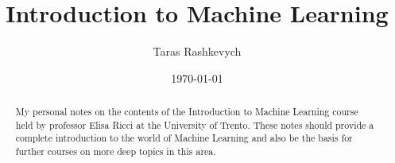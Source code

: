 \documentclass[12pt, letterpaper, twoside]{article}
\title{Introduction to Machine Learning}
\author{Taras Rashkevych}
\date{\today}
\begin{document}
\begin{titlepage}
    \maketitle
\end{titlepage}

\begin{abstract}
    My personal notes on the contents of the
    Introduction to Machine Learning course held
    by professor Elisa Ricci at the University of Trento.
    These notes should provide a complete introduction
    to the world of Machine Learning and also be the basis
    for further courses on more deep topics in this area.
\end{abstract}
\end{document}
